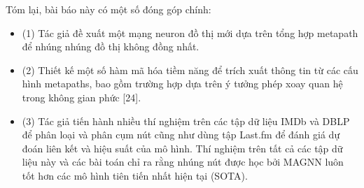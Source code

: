 Tóm lại, bài báo này có một số đóng góp chính:
\begin{itemize}
  \item[] (1) Tác giả đề xuất một mạng neuron đồ thị mới  dựa trên tổng hợp metapath để nhúng nhúng đồ thị không đồng nhất.
  \item[] (2) Thiết kế một số hàm mã hóa tiềm năng để trích xuất thông tin từ các cấu hình metapaths, bao gồm trường hợp dựa trên ý tưởng phép xoay quan hệ trong không gian phức [24].
  \item[] (3) Tác giả tiến hành nhiều thí nghiệm trên các tập dữ liệu IMDb và DBLP để phân loại và phân cụm nút cũng như dùng tập Last.fm để đánh giá dự đoán liên kết và hiệu suất của mô hình. Thí nghiệm trên tất cả các tập dữ liệu này và các bài toán chỉ ra rằng nhúng nút được học bởi MAGNN luôn tốt hơn các mô hình tiên tiến nhất hiện tại (SOTA).
\end{itemize}
